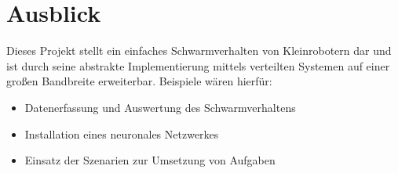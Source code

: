 \section{Ausblick}

Dieses Projekt stellt ein einfaches Schwarmverhalten von Kleinrobotern dar und ist durch seine abstrakte Implementierung mittels verteilten Systemen auf einer großen Bandbreite erweiterbar. Beispiele wären hierfür:

\begin{itemize}
	\item Datenerfassung und Auswertung des Schwarmverhaltens
	\item Installation eines neuronales Netzwerkes
	\item Einsatz der Szenarien zur Umsetzung von Aufgaben
\end{itemize}